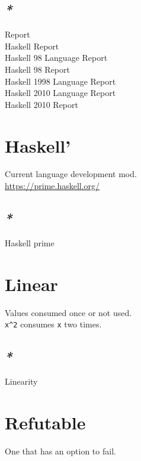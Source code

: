 \documentclass[a4paper,14pt,oneside]{book}
\begin{document}
\section{\emph{*}}
\label{sec:org25a9039}
\label{orgc2be310}Report\\
\label{org65b7c77}Haskell Report\\
\label{org75538ed}Haskell 98 Language Report\\
\label{org11ee5c9}Haskell 98 Report\\
\label{orgacc6f8a}Haskell 1998 Language Report\\
\label{org6b9feb0}Haskell 2010 Language Report\\
\label{org1141801}Haskell 2010 Report\\

\chapter{\label{orgf1dbcc1}Haskell'}
\label{sec:orgf3a7845}
Current language development mod.\\

\url{https://prime.haskell.org/}\\

\section{\emph{*}}
\label{sec:org94057ec}

\label{orgc19d434}Haskell prime\\

\chapter{\label{org9fc0700}Linear}
\label{sec:org638d401}
Values consumed once or not used.\\

\texttt{x\textasciicircum{}2} consumes \texttt{x} two times.\\

\section{\emph{*}}
\label{sec:org1c701b3}

\label{org8ee9a44}Linearity\\

\chapter{\label{org01e930c}Refutable}
\label{sec:orgf9b63f6}
One that has an option to fail.\\
\end{document}
